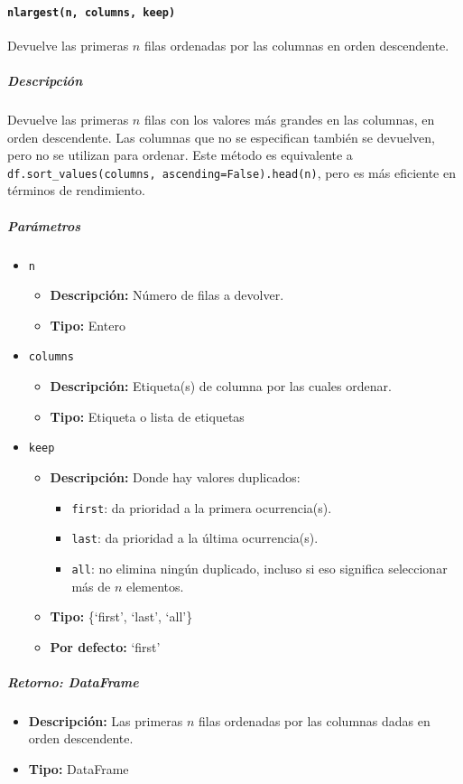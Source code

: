 \paragraph{\texttt{nlargest(n, columns, keep)}} Devuelve las primeras \( n \) filas ordenadas por las columnas en orden descendente.
\subparagraph{\textbf{Descripción}} Devuelve las primeras \( n \) filas con los valores más grandes en las columnas, en orden descendente. Las columnas que no se especifican también se devuelven, pero no se utilizan para ordenar. Este método es equivalente a \texttt{df.sort\_values(columns, ascending=False).head(n)}, pero es más eficiente en términos de rendimiento.
\subparagraph{\textbf{Parámetros}}
\begin{itemize}
\item \texttt{n}
\begin{itemize}
\item \textbf{Descripción:} Número de filas a devolver.
\item \textbf{Tipo:} Entero
\end{itemize}
\item \texttt{columns}
\begin{itemize}
\item \textbf{Descripción:} Etiqueta(s) de columna por las cuales ordenar.
\item \textbf{Tipo:} Etiqueta o lista de etiquetas
\end{itemize}
\item \texttt{keep}
\begin{itemize}
\item \textbf{Descripción:} Donde hay valores duplicados:
\begin{itemize}
\item \texttt{first}: da prioridad a la primera ocurrencia(s).
\item \texttt{last}: da prioridad a la última ocurrencia(s).
\item \texttt{all}: no elimina ningún duplicado, incluso si eso significa seleccionar más de \( n \) elementos.
\end{itemize}
\item \textbf{Tipo:} \{`first', `last', `all'\}
\item \textbf{Por defecto:} `first'
\end{itemize}
\end{itemize}
\subparagraph{\textbf{Retorno:} DataFrame}
\begin{itemize}
\item \textbf{Descripción:} Las primeras \( n \) filas ordenadas por las columnas dadas en orden descendente.
\item \textbf{Tipo:} DataFrame
\end{itemize}
